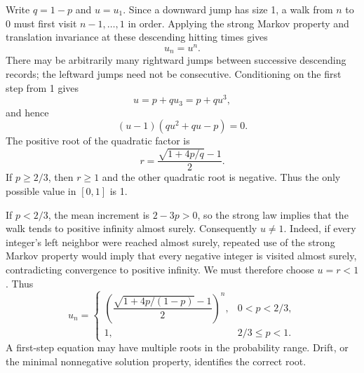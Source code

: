 Write $q=1-p$ and $u=u_1$. Since a downward jump has size 1, a walk from $n$ to 0 must first visit $n-1,\ldots,1$ in order. Applying the strong Markov property and translation invariance at these descending hitting times gives
\[
 u_n=u^n.
\]
There may be arbitrarily many rightward jumps between successive descending records; the leftward jumps need not be consecutive. Conditioning on the first step from 1 gives
\[
 u=p+qu_3=p+qu^3,
\]
and hence
\[
 (u-1)(qu^2+qu-p)=0.
\]
The positive root of the quadratic factor is
\[
 r=\frac{\sqrt{1+4p/q}-1}{2}.
\]
If $p\ge2/3$, then $r\ge1$ and the other quadratic root is negative. Thus the only possible value in $[0,1]$ is 1.

If $p<2/3$, the mean increment is $2-3p>0$, so the strong law implies that the walk tends to positive infinity almost surely. Consequently $u\ne1$. Indeed, if every integer's left neighbor were reached almost surely, repeated use of the strong Markov property would imply that every negative integer is visited almost surely, contradicting convergence to positive infinity. We must therefore choose $u=r<1$. Thus
\[
 \boxed{u_n=
 \begin{cases}
 \left(\dfrac{\sqrt{1+4p/(1-p)}-1}{2}\right)^n,
       &0<p<2/3,\\[4pt]
 1,&2/3\le p<1.
 \end{cases}}
\]
A first-step equation may have multiple roots in the probability range. Drift, or the minimal nonnegative solution property, identifies the correct root.
